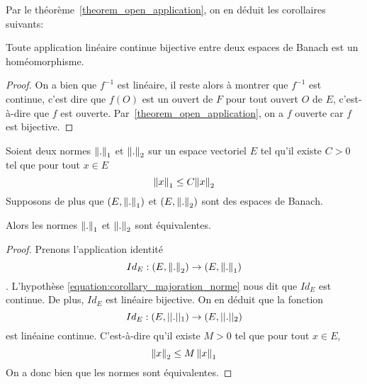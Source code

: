 Par le théorème~\ref{theorem_open_application}, on en déduit les corollaires
suivants:

\begin{corollary}
	Toute application linéaire continue bijective entre deux espaces de Banach
	est un homéomorphisme.
\end{corollary}

\ifdefined\outputproof
\begin{proof}
	On a bien que $f^{-1}$ est linéaire, il reste alors à montrer que $f^{-1}$
	est continue, c'est dire que $f(O)$ est un ouvert de $F$ pour tout ouvert
	$O$ de $E$, c'est-à-dire que $f$ est ouverte.
	Par~\ref{theorem_open_application}, on a $f$ ouverte car $f$ est bijective.
\end{proof}
\fi

\begin{corollary}
	Soient deux normes $\norm{.}_{1}$ et $\norm{.}_{2}$ sur un espace
	vectoriel $E$ tel qu'il existe $C > 0$ tel que pour tout $x \in E$
	\begin{equation}
		\label{equation:corollary_majoration_norme}
		\norm{x}_{1} \leq C \norm{x}_{2}
	\end{equation}
	Supposons de plus que $(E, \norm{.}_{1})$ et
	$(E, \norm{.}_{2})$ sont des espaces de Banach.

	Alors les normes $\norm{.}_{1}$ et $\norm{.}_{2}$ sont équivalentes.
\end{corollary}

\ifdefined\outputproof
\begin{proof}
	Prenons l'application identité
	\begin{equation}
		Id_{E} : (E, \norm{.}_{2}) \rightarrow (E, \norm{.}_{1})
	\end{equation}.
	L'hypothèse \ref{equation:corollary_majoration_norme} nous dit que $Id_{E}$
	est continue.
	De plus, $Id_{E}$ est linéaire bijective.
	On en d\'eduit que la fonction
	\begin{equation}
		Id_{E} : (E, ||.||_{1}) \rightarrow (E, ||.||_{2})
	\end{equation}
	est linéaine continue. C'est-à-dire qu'il existe $M > 0
	$ tel que pour tout $x \in E$,
	\begin{equation}
		\norm{x}_{2} \leq M \, \norm{x}_{1}
	\end{equation}
	On a donc bien que les normes sont équivalentes.
\end{proof}
\fi

